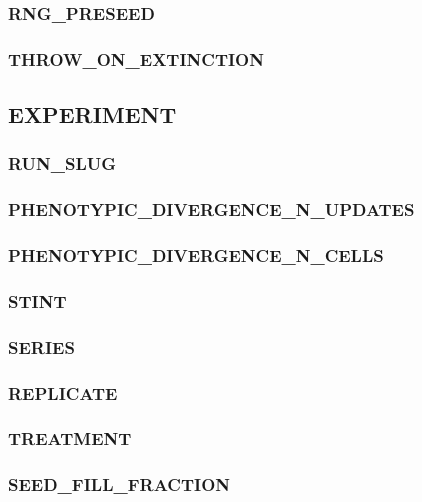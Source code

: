 \subsubsection{RNG\_PRESEED}

\subsubsection{THROW\_ON\_EXTINCTION}


\subsection{EXPERIMENT}


\subsubsection{RUN\_SLUG}

\subsubsection{PHENOTYPIC\_DIVERGENCE\_N\_UPDATES}

\subsubsection{PHENOTYPIC\_DIVERGENCE\_N\_CELLS}

\subsubsection{STINT}

\subsubsection{SERIES}

\subsubsection{REPLICATE}

\subsubsection{TREATMENT}

\subsubsection{SEED\_FILL\_FRACTION}

